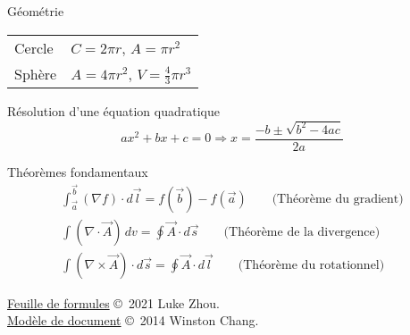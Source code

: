 \documentclass[10pt,landscape]{article}
\newcommand{\extraline}{\vspace{1em}}
\newcommand{\halfline}{\vspace{0.5em}}
\newcommand{\tableindent}{\hspace{1.5em}}
\begin{document}
\begin{multicols}{3}
Géométrie \\
\halfline
\begin{tabular}{@{\tableindent}ll@{}}
	Cercle & $C = 2\pi r $, $A =\pi r^2$ \\
	Sphère & $A = 4\pi r^2$, $V = \frac{4}{3}\pi r^3 $ \\
\end{tabular}
\extraline

Résolution d'une équation quadratique
\[ ax^2 + bx + c = 0 \Longrightarrow x = \frac{-b \pm \sqrt{b^2-4ac} }{2a} \]

Théorèmes fondamentaux
\begin{gather*}
\int_{\vec{a}}^{\vec{b}} (\nabla f)\cdot d\vec{l} = f(\vec{b}) - f(\vec{a}) 
\qquad\text{(Théorème du gradient)} \\
\int (\nabla \cdot \vec{A}) \, dv = \oint \vec{A}\cdot d\vec{s}
\qquad\text{(Théorème de la divergence)} \\
\int (\nabla\times\vec{A})\cdot d\vec{s} = \oint \vec{A}\cdot d\vec{l}
\qquad\text{(Théorème du rotationnel)}
\end{gather*}






\hrulefill


\scriptsize

\href{https://github.com/zhouluke/PhysicsFormulas}{Feuille de formules}  \copyright\ 2021 Luke Zhou. \\
\href{http://wch.github.io/latexsheet/}{Modèle de document}  \copyright\ 2014 Winston Chang.


\end{multicols}
\end{document}
